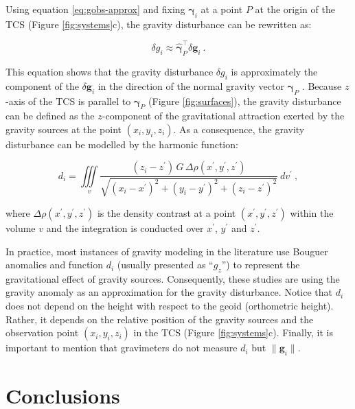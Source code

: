 \documentclass[manuscript]{geophysics}
\begin{document}
Using equation \ref{eq:gobs-approx} and fixing 
$\hat{\boldsymbol{\gamma}}_{i}$ at a point $P$ at
the origin of the TCS (Figure \ref{fig:systems}c),
the gravity disturbance can be rewritten as:

\begin{equation}
\delta g_{i} \approx \hat{\boldsymbol{\gamma}}_{P}^{\top} \delta \mathbf{g}_{i} \: .
\label{eq:gravity-disturbance-approx-TCS}
\end{equation}

\noindent
This equation shows that the gravity disturbance $\delta g_{i}$ is
approximately the component of the $\delta \mathbf{g}_{i}$ in the direction of
the normal gravity vector $\boldsymbol{\gamma}_P$
\citep{hofmann-wellenhof-moritz2005, sanso_sideris2013}.
Because $z$-axis of the TCS is parallel to $\boldsymbol{\gamma}_P$
(Figure \ref{fig:surfaces}), the gravity disturbance can be defined as the
$z$-component of the gravitational attraction exerted by the gravity sources at
the point $(x_{i}, y_{i}, z_{i})$.
As a consequence, the gravity disturbance can be modelled by the harmonic
function:

\begin{equation}
d_{i} = \iiint\limits_{v}
\frac{(z_{i} - z^{\prime}) \, G \, \Delta\rho(x^{\prime}, y^{\prime}, z^{\prime})}
{\sqrt{(x_{i} - x^{\prime})^{2} +
		(y_{i} - y^{\prime})^{2} + (z_{i} - z^{\prime})^{2}}} \: dv^{\prime} \: ,
\label{eq:gz-local}
\end{equation}

\noindent
where $\Delta\rho(x^{\prime}, y^{\prime}, z^{\prime})$
is the density contrast at a point $(x^{\prime}, y^{\prime}, z^{\prime})$
within the volume $v$ and the integration is conducted over $x^{\prime}$,
$y^{\prime}$ and $z^{\prime}$.

In practice, most instances of gravity modeling in the literature use Bouguer
anomalies and function $d_{i}$ (usually presented as ``$g_z$'') to represent
the gravitational effect of gravity sources.
Consequently, these studies are using the gravity
anomaly as an approximation for the gravity disturbance.
Notice that $d_{i}$ does not depend on the
height with respect to the geoid (orthometric height).
Rather, it depends on the relative position of the gravity sources and the
observation point $(x_{i}, y_{i}, z_{i})$ in the TCS (Figure \ref{fig:systems}c).
Finally, it is important to mention that gravimeters do not measure $d_{i}$ but
$\| \mathbf{g}_i \|$.


\section{Conclusions}
\end{document}

